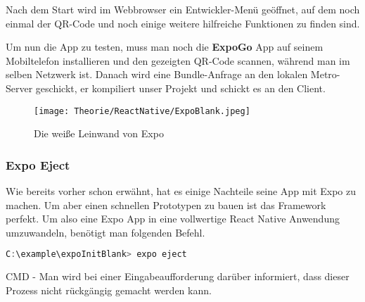 Nach dem Start wird im Webbrowser ein Entwickler-Menü geöffnet, auf dem noch einmal der QR-Code
und noch einige weitere hilfreiche Funktionen zu finden sind.

Um nun die App zu testen, muss man noch die \textbf{ExpoGo} App auf seinem Mobiltelefon installieren und den
gezeigten QR-Code scannen, während man im selben Netzwerk ist. Danach wird eine Bundle-Anfrage an
den lokalen Metro-Server geschickt, er kompiliert unser Projekt und schickt es an den Client.

\begin{figure}[H]
  \begin{center}
    \texttt{[image: Theorie/ReactNative/ExpoBlank.jpeg]}
    \caption{Die weiße Leinwand von Expo}
  \end{center}
\end{figure}

\subsubsection{Expo Eject}
Wie bereits vorher schon erwähnt, hat es einige Nachteile seine App mit Expo zu machen. Um aber
einen schnellen Prototypen zu bauen ist das Framework perfekt. Um also eine Expo App in eine
vollwertige React Native Anwendung umzuwandeln, benötigt man folgenden Befehl.

\begin{code}[htp]
\begin{lstlisting}[firstnumber=1,language=JavaScript, style=CMD]
C:\example\expoInitBlank> expo eject
\end{lstlisting}
\caption{CMD - Man wird bei einer Eingabeaufforderung darüber informiert, dass dieser Prozess nicht rückgängig
gemacht werden kann.}
\end{code}
